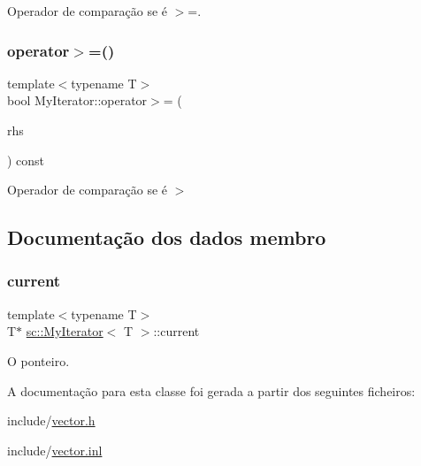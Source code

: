 Operador de comparação se é $>$=. 

\mbox{\label{classsc_1_1MyIterator_ae8dbcb46b7277bc105903ae149670600}} 
\subsubsection{\texorpdfstring{operator$>$=()}{operator>=()}}
{\footnotesize\ttfamily template$<$typename T$>$ \\
bool My\+Iterator\+::operator$>$= (\begin{DoxyParamCaption}\item[{const \hyperlink{classsc_1_1MyIterator}{My\+Iterator}$<$ T $>$ \&}]{rhs }\end{DoxyParamCaption}) const}



Operador de comparação se é $>$ 



\subsection{Documentação dos dados membro}
\mbox{\label{classsc_1_1MyIterator_a33cc25bbe4f629ffff6f8b85b268f1f1}} 
\subsubsection{\texorpdfstring{current}{current}}
{\footnotesize\ttfamily template$<$typename T$>$ \\
T$\ast$ \hyperlink{classsc_1_1MyIterator}{sc\+::\+My\+Iterator}$<$ T $>$\+::current\hspace{0.3cm}{\ttfamily [private]}}



O ponteiro. 



A documentação para esta classe foi gerada a partir dos seguintes ficheiros\+:\begin{DoxyCompactItemize}
\item 
include/\hyperlink{vector_8h}{vector.\+h}\item 
include/\hyperlink{vector_8inl}{vector.\+inl}\end{DoxyCompactItemize}
